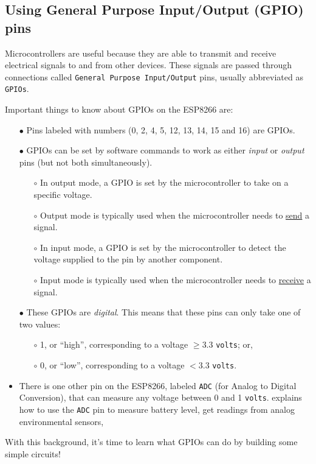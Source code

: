 \subsection{Using General Purpose Input/Output (GPIO) pins}
Microcontrollers are useful because they are able to transmit and receive electrical signals to and from other devices.
These signals are passed through connections called \texttt{General Purpose Input/Output} pins, usually abbreviated as \texttt{GPIOs}.  

Important things to know about GPIOs on the ESP8266 are:
\begin{itemize}
	\item[$\bullet$] Pins labeled with numbers (0, 2, 4, 5, 12, 13, 14, 15 and 16) are GPIOs.
	\item[$\bullet$] GPIOs can be set by software commands to work as either \emph{input} or \emph{output} pins (but not both simultaneously).
	 \begin{itemize}
		\item[$\circ$] In output mode, a GPIO is set by the microcontroller to take on a specific voltage. 
		\item[$\circ$] Output mode is typically used when the microcontroller needs to \underline{send} a signal.
		\item[$\circ$] In input mode, a GPIO is set by the microcontroller to detect the voltage supplied to the pin by another component. 
		\item[$\circ$] Input mode is typically used when the microcontroller needs to \underline{receive} a signal.
	\end{itemize}
	\item[$\bullet$] These GPIOs are \emph{digital}. This means that these pins can only take one of two values:
	 \begin{itemize}
	 	\item[$\circ$] 1, or ``high'', corresponding to a voltage $\ge 3.3$ \texttt{volts}; or,
	 	\item[$\circ$] 0, or ``low'', corresponding to a voltage $< 3.3$ \texttt{volts}.
	\end{itemize}
	\item There is one other pin on the ESP8266, labeled \texttt{ADC} (for Analog to Digital Conversion), that can measure any voltage between 0  and 1 \texttt{volts}.  explains how to use the \texttt{ADC} pin to measure battery level, get readings from analog environmental sensors, \etc
\end{itemize} 
With this background, it's time to learn what GPIOs can do by building some simple circuits!

